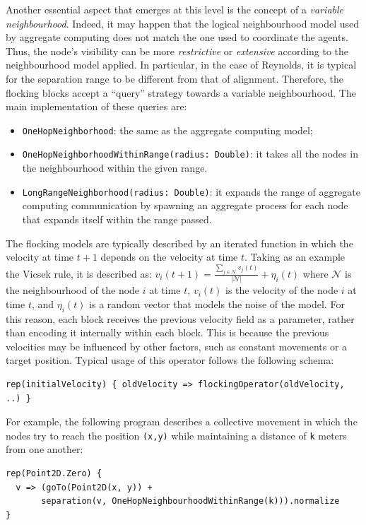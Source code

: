 Another essential aspect that emerges at this level is the concept of a \emph{variable neighbourhood}. 
%
Indeed, it may happen that the logical neighbourhood model used by aggregate computing 
 does not match the one used to coordinate the agents. 
 Thus, the node's visibility can be more \emph{restrictive} or \emph{extensive} 
 according to the neighbourhood model applied. 
%
In particular, in the case of Reynolds, 
 it is typical for the separation range to be different from that of alignment. 
% 
Therefore, the flocking blocks accept a ``query'' strategy towards a variable neighbourhood.
 The main implementation of these queries are:
\begin{itemize}
  \item \lstinline|OneHopNeighborhood|: the same as the aggregate computing model;
  \item \lstinline|OneHopNeighborhoodWithinRange(radius: Double)|: it takes all the nodes in the neighbourhood within the given range.
  \item \lstinline|LongRangeNeighborhood(radius: Double)|: it expands the range of 
    aggregate computing communication by spawning 
    an aggregate process for each node that expands itself within the range passed.
\end{itemize}

The flocking models are typically described 
 by an iterated function in which the velocity at time $t+1$ depends on the velocity at time $t$.
Taking as an example the Vicsek rule, it is described as:
$ v_i(t + 1) = \frac{\sum_{j \in \mathcal{N}}v_j(t) }{|\mathcal{N}|} + \eta_i(t)$
where $\mathcal{N}$ is the neighbourhood of the node $i$ at time $t$, 
 $v_i(t)$ is the velocity of the node $i$ at time $t$, 
 and $\eta_i(t)$ is a random vector that models the noise of the model.
%
For this reason, 
 each block receives the previous velocity field as a parameter, 
 rather than encoding it internally within each block. 
% 
This is because the previous velocities 
 may be influenced by other factors, 
 such as constant movements or a target position. 
%
Typical usage of this operator follows the following schema:
\begin{lstlisting}
rep(initialVelocity) { oldVelocity => flockingOperator(oldVelocity, ..) }  
\end{lstlisting}
For example, 
 the following program describes a collective movement 
 in which the nodes try to reach the position \texttt{(x,y)} while maintaining a distance of \texttt{k} meters from one another:
\begin{lstlisting}
rep(Point2D.Zero) {
  v => (goTo(Point2D(x, y)) + 
       separation(v, OneHopNeighbourhoodWithinRange(k))).normalize
}
\end{lstlisting}

